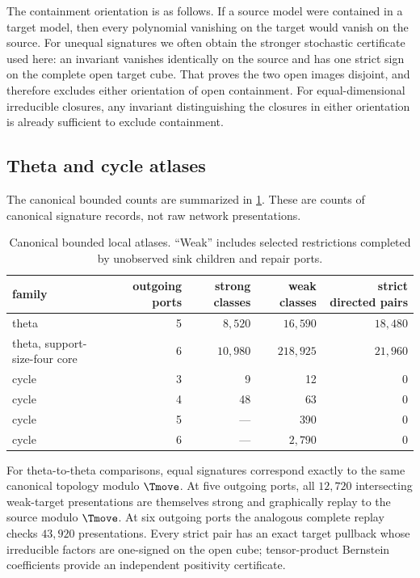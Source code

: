 The containment orientation is as follows.  If a source model were contained in a target model, then every polynomial vanishing on the target would vanish on the source.  For unequal signatures we often obtain the stronger stochastic certificate used here: an invariant vanishes identically on the source and has one strict sign on the complete open target cube.  That proves the two open images disjoint, and therefore excludes either orientation of open containment.  For equal-dimensional irreducible closures, any invariant distinguishing the closures in either orientation is already sufficient to exclude containment.

\subsection{Theta and cycle atlases}

The canonical bounded counts are summarized in \cref{tab:atlas-counts}.  These are counts of canonical signature records, not raw network presentations.

\begin{table}[t]
\centering
\caption{Canonical bounded local atlases.  ``Weak'' includes selected restrictions completed by unobserved sink children and repair ports.}
\label{tab:atlas-counts}
\begin{tabular}{@{}lrrrr@{}}
\toprule
family & outgoing ports & strong classes & weak classes & strict directed pairs\\
\midrule
theta & 5 & $8{,}520$ & $16{,}590$ & $18{,}480$\\
theta, support-size-four core & 6 & $10{,}980$ & $218{,}925$ & $21{,}960$\\
cycle & 3 & 9 & 12 & 0\\
cycle & 4 & 48 & 63 & 0\\
cycle & 5 & --- & 390 & 0\\
cycle & 6 & --- & $2{,}790$ & 0\\
\bottomrule
\end{tabular}
\end{table}

For theta-to-theta comparisons, equal signatures correspond exactly to the same canonical topology modulo $\Tmove$.  At five outgoing ports, all $12{,}720$ intersecting weak-target presentations are themselves strong and graphically replay to the source modulo $\Tmove$.  At six outgoing ports the analogous complete replay checks $43{,}920$ presentations.  Every strict pair has an exact target pullback whose irreducible factors are one-signed on the open cube; tensor-product Bernstein coefficients provide an independent positivity certificate.

